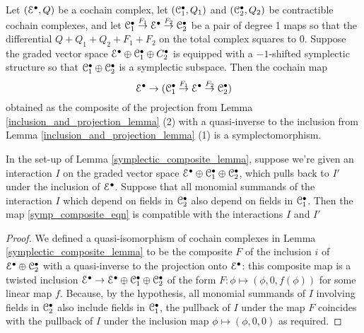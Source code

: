 \documentclass[10pt, oneside]{article}
\begin{document}
\begin{lemma} \label{symplectic_composite_lemma}
Let $(\mathcal{E}^\bullet,Q)$ be a cochain complex, let $(\mathcal{C}_1^\bullet, Q_1)$ and $(\mathcal{C}_2^\bullet, Q_2)$ be contractible cochain complexes, and let $\mathcal{C}_1^\bullet \overset{F_1}\to \mathcal{E}^\bullet \overset{F_2}\to \mathcal{C}_2^\bullet$ be a pair of degree 1 maps so that the differential $Q + Q_1 + Q_2 + F_1 + F_2$ on the total complex squares to 0.  Suppose the graded vector space $\mathcal{E}^\bullet \oplus \mathcal{C}_1^\bullet \oplus C_2^\bullet$ is equipped with a $-1$-shifted symplectic structure so that $\mathcal{C}_1^\bullet \oplus \mathcal{C}_2^\bullet$ is a symplectic subspace.  Then the cochain map 
\begin{equation}
\label{symp_composite_eqn}\mathcal{E}^\bullet \to (\mathcal{C}_1^\bullet \overset{F_1}\to \mathcal{E}^\bullet \overset{F_2}\to \mathcal{C}_2^\bullet)
\end{equation}
obtained as the composite of the projection from Lemma \ref{inclusion_and_projection_lemma} (2) with a quasi-inverse to the inclusion from Lemma \ref{inclusion_and_projection_lemma} (1) is a symplectomorphism.
\end{lemma}

\begin{lemma} \label{interaction_pullback_lemma}
In the set-up of Lemma \ref{symplectic_composite_lemma}, suppose we're given an interaction $I$ on the graded vector space $\mathcal{E}^\bullet \oplus \mathcal{C}_1^\bullet \oplus \mathcal{C}_2^\bullet$, which pulls back to $I'$ under the inclusion of $\mathcal{E}^\bullet$.  Suppose that all monomial summands of the interaction $I$ which depend on fields in $\mathcal{C}_2^\bullet$ also depend on fields in $\mathcal{C}_1^\bullet$. Then the map \ref{symp_composite_eqn} is compatible with the interactions $I$ and $I'$
\end{lemma}

\begin{proof}
We defined a quasi-isomorphism of cochain complexes in Lemma \ref{symplectic_composite_lemma} to be the composite $F$ of the inclusion $i$ of $\mathcal{E}^\bullet \oplus \mathcal{C}_2^\bullet$ with a quasi-inverse to the projection onto $\mathcal{E}^\bullet$: this composite map is a twisted inclusion $\mathcal{E}^\bullet \to \mathcal{E}^\bullet \oplus \mathcal{C}_1^\bullet \oplus \mathcal{C}_2^\bullet$ of the form $F \colon \phi \mapsto (\phi, 0, f(\phi))$ for some linear map $f$.  Because, by the hypothesis, all monomial summands of $I$ involving fields in $\mathcal{C}_2^\bullet$ also include fields in $\mathcal{C}_1^\bullet$, the pullback of $I$ under the map $F$ coincides with the pullback of $I$ under the inclusion map $\phi \mapsto (\phi, 0, 0)$ as required.
\end{proof}
\end{document}
